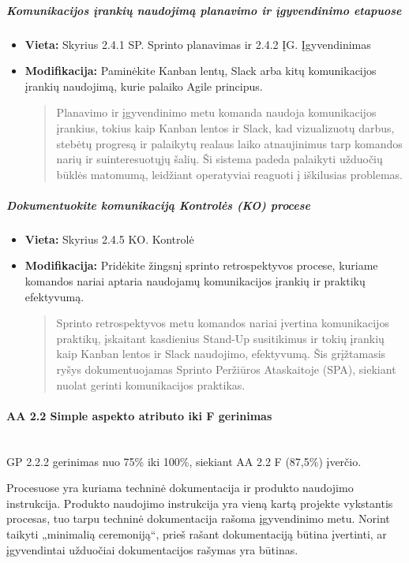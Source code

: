 \documentclass{article}
\newcommand{\subsubsubsection}[1]{\paragraph{#1}\mbox{}\\}
\begin{document}
\subparagraph{Komunikacijos įrankių naudojimą planavimo ir įgyvendinimo etapuose}
\begin{itemize}
    \item \textbf{Vieta:} Skyrius 2.4.1 SP. Sprinto planavimas ir 2.4.2 ĮG. Įgyvendinimas
    \item \textbf{Modifikacija:} Paminėkite Kanban lentų, Slack arba kitų komunikacijos įrankių naudojimą, kurie palaiko Agile principus. 
    \begin{quote}
    Planavimo ir įgyvendinimo metu komanda naudoja komunikacijos įrankius, tokius kaip Kanban lentos ir Slack, kad vizualizuotų darbus, stebėtų progresą ir palaikytų realaus laiko atnaujinimus tarp komandos narių ir suinteresuotųjų šalių. Ši sistema padeda palaikyti užduočių būklės matomumą, leidžiant operatyviai reaguoti į iškilusias problemas.
    \end{quote}
\end{itemize}

\subparagraph{Dokumentuokite komunikaciją Kontrolės (KO) procese}
\begin{itemize}
    \item \textbf{Vieta:} Skyrius 2.4.5 KO. Kontrolė
    \item \textbf{Modifikacija:} Pridėkite žingsnį sprinto retrospektyvos procese, kuriame komandos nariai aptaria naudojamų komunikacijos įrankių ir praktikų efektyvumą.
    \begin{quote}
        Sprinto retrospektyvos metu komandos nariai įvertina komunikacijos praktikų, įskaitant kasdienius Stand-Up susitikimus ir tokių įrankių kaip Kanban lentos ir Slack naudojimo, efektyvumą. Šis grįžtamasis ryšys dokumentuojamas Sprinto Peržiūros Ataskaitoje (SPA), siekiant nuolat gerinti komunikacijos praktikas.
    \end{quote}
\end{itemize}


\subsubsubsection{AA 2.2 Simple aspekto atributo iki F gerinimas}

GP 2.2.2 gerinimas nuo 75\% iki 100\%, siekiant AA 2.2 F (87,5\%) įverčio.

Procesuose yra kuriama techninė dokumentacija ir produkto naudojimo instrukcija. Produkto naudojimo instrukcija yra vieną kartą projekte vykstantis procesas, tuo tarpu techninė dokumentacija rašoma įgyvendinimo metu. Norint taikyti „minimalią ceremoniją“, prieš rašant dokumentaciją būtina įvertinti, ar įgyvendintai užduočiai dokumentacijos rašymas yra būtinas.
\end{document}
